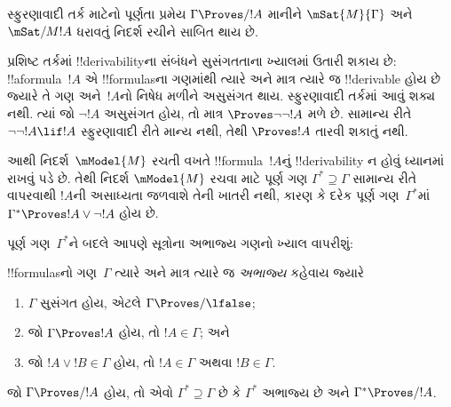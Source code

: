 \documentclass[../../../include/open-logic-section]{subfiles}
\begin{document}


સ્ફુરણાવાદી તર્ક માટેનો પૂર્ણતા પ્રમેય $\Gamma \Proves/ !A$
માનીને $\mSat{M}{\Gamma}$ અને~$\mSat/{M}{!A}$ ધરાવતું
નિદર્શ રચીને સાબિત થાય છે.

પ્રશિષ્ટ તર્કમાં !!{derivability}ના સંબંધને સુસંગતતાના
ખ્યાલમાં ઉતારી શકાય છે: !!a{formula}~$!A$ એ
!!{formula}sના ગણમાંથી ત્યારે અને માત્ર ત્યારે જ
!!{derivable} હોય છે જ્યારે તે ગણ અને~$!A$નો નિષેધ
મળીને અસુસંગત થાય. સ્ફુરણાવાદી તર્કમાં આવું શક્ય નથી.
ત્યાં જો $\lnot!A$ અસુસંગત હોય, તો માત્ર
$\Proves \lnot\lnot !A$ મળે છે. સામાન્ય રીતે
$\lnot\lnot!A \lif !A$ સ્ફુરણાવાદી રીતે માન્ય નથી,
તેથી $\Proves !A$ તારવી શકાતું નથી.

આથી નિદર્શ~$\mModel{M}$ રચતી વખતે !!{formula}~$!A$નું
!!{derivability} ન હોવું ધ્યાનમાં રાખવું પડે છે. તેથી નિદર્શ
$\mModel{M}$ રચવા માટે પૂર્ણ ગણ $\Gamma^* \supseteq \Gamma$
સામાન્ય રીતે વાપરવાથી $!A$ની અસાધ્યતા જળવાશે તેની
ખાતરી નથી, કારણ કે દરેક પૂર્ણ ગણ~$\Gamma^*$માં
$\Gamma^* \Proves !A \lor \lnot !A$ હોય છે.


પૂર્ણ ગણ~$\Gamma^*$ને બદલે આપણે સૂત્રોના અભાજ્ય ગણનો
ખ્યાલ વાપરીશું:

\begin{defn}
  !!{formula}sનો ગણ~$\Gamma$ ત્યારે અને માત્ર ત્યારે જ
  \emph{અભાજ્ય} કહેવાય જ્યારે
  \begin{enumerate}
  \item{} $\Gamma$ સુસંગત હોય, એટલે
    $\Gamma \Proves/ \lfalse$;
  \item{} જો $\Gamma \Proves !A$ હોય,
    તો $!A \in \Gamma$; અને
  \item{} જો $!A \lor !B \in \Gamma$
    હોય, તો $!A \in \Gamma$ અથવા $!B \in \Gamma$.
  \end{enumerate}
\end{defn}



\begin{lem}
   જો $\Gamma \Proves/ !A$ હોય,
  તો એવો $\Gamma^* \supseteq \Gamma$ છે કે $\Gamma^*$
  અભાજ્ય છે અને $\Gamma^* \Proves/ !A$.
\end{lem}
\end{document}
